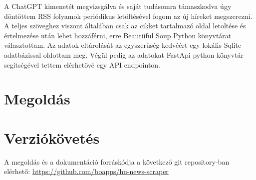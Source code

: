 \documentclass[]{article}
\begin{document}
A ChatGPT kimenetét megvizsgálva és saját tudásomra támaszkodva úgy döntöttem RSS folyamok periódikus letöltésével fogom az új híreket megszerezni. A teljes szöveghez viszont általában csak az cikket tartalmazó oldal letoltése és értelmezése után lehet hozzáférni, erre Beautiiful Soup Python könyvtárat választottam. Az adatok eltárolását az egyszerűség kedvéért egy lokális Sqlite adatbázissal oldottam meg. Végül pedig az adatokat FastApi python könyvtár segítségével tettem elérhetővé egy API endpointon.

\section{Megoldás}

\section{Verziókövetés}

A megoldás és a dokumentáció forráskódja a következő git repository-ban elérhető: \url{https://github.com/boapps/hu-news-scraper}
\end{document}
